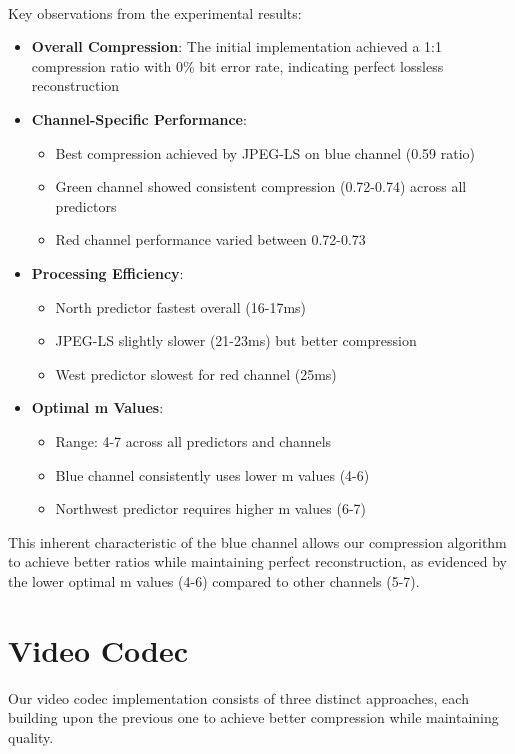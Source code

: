 \documentclass[a4paper,14pt]{article}
\begin{document}
\paragraph{}
Key observations from the experimental results:
\begin{itemize}
    \item \textbf{Overall Compression}: The initial implementation achieved a 1:1 compression ratio with 0\% bit error rate, indicating perfect lossless reconstruction
    
    \item \textbf{Channel-Specific Performance}:
    \begin{itemize}
        \item Best compression achieved by JPEG-LS on blue channel (0.59 ratio)
        \item Green channel showed consistent compression (0.72-0.74) across all predictors
        \item Red channel performance varied between 0.72-0.73
    \end{itemize}
    
    \item \textbf{Processing Efficiency}:
    \begin{itemize}
        \item North predictor fastest overall (16-17ms)
        \item JPEG-LS slightly slower (21-23ms) but better compression
        \item West predictor slowest for red channel (25ms)
    \end{itemize}
    
    \item \textbf{Optimal m Values}:
    \begin{itemize}
        \item Range: 4-7 across all predictors and channels
        \item Blue channel consistently uses lower m values (4-6)
        \item Northwest predictor requires higher m values (6-7)
    \end{itemize}
\end{itemize}

This inherent characteristic of the blue channel allows our compression algorithm to achieve better ratios while maintaining perfect reconstruction, as evidenced by the lower optimal m values (4-6) compared to other channels (5-7).
\section{Video Codec}
Our video codec implementation consists of three distinct approaches, each building upon the previous one to achieve better compression while maintaining quality.
\end{document}
